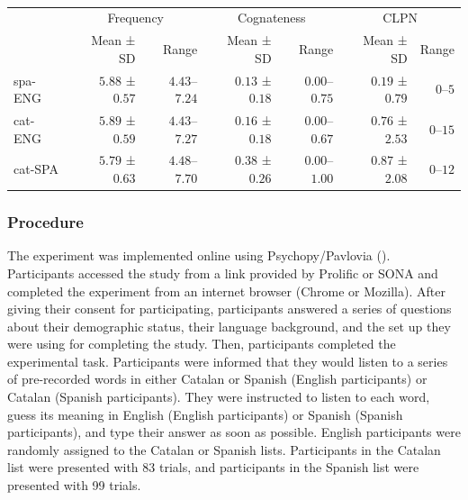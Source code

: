 \documentclass[
]{article}
\begin{document}
\begin{longtable}{l|rrrrrr}

\caption{\label{tbl-stimuli}}

\tabularnewline

\toprule
\multicolumn{1}{l}{} & \multicolumn{2}{c}{Frequency} & \multicolumn{2}{c}{Cognateness} & \multicolumn{2}{c}{CLPN} \\ 
\cmidrule(lr){2-3} \cmidrule(lr){4-5} \cmidrule(lr){6-7}
\multicolumn{1}{l}{} & Mean ± SD & Range & Mean ± SD & Range & Mean ± SD & Range \\ 
\midrule\addlinespace[2.5pt]
spa-ENG & $5.88$ ± $0.57$ & $4.43$–$7.24$ & $0.13$ ± $0.18$ & $0.00$–$0.75$ & $0.19$ ± $0.79$ & $0$–$5$ \\ 
cat-ENG & $5.89$ ± $0.59$ & $4.43$–$7.27$ & $0.16$ ± $0.18$ & $0.00$–$0.67$ & $0.76$ ± $2.53$ & $0$–$15$ \\ 
cat-SPA & $5.79$ ± $0.63$ & $4.48$–$7.70$ & $0.38$ ± $0.26$ & $0.00$–$1.00$ & $0.87$ ± $2.08$ & $0$–$12$ \\ 
\bottomrule

\end{longtable}

\subsubsection{Procedure}\label{procedure}

The experiment was implemented online using Psychopy/Pavlovia
(). Participants
accessed the study from a link provided by Prolific or SONA and
completed the experiment from an internet browser (Chrome or Mozilla).
After giving their consent for participating, participants answered a
series of questions about their demographic status, their language
background, and the set up they were using for completing the study.
Then, participants completed the experimental task. Participants were
informed that they would listen to a series of pre-recorded words in
either Catalan or Spanish (English participants) or Catalan (Spanish
participants). They were instructed to listen to each word, guess its
meaning in English (English participants) or Spanish (Spanish
participants), and type their answer as soon as possible. English
participants were randomly assigned to the Catalan or Spanish lists.
Participants in the Catalan list were presented with 83 trials, and
participants in the Spanish list were presented with 99 trials.
\end{document}
